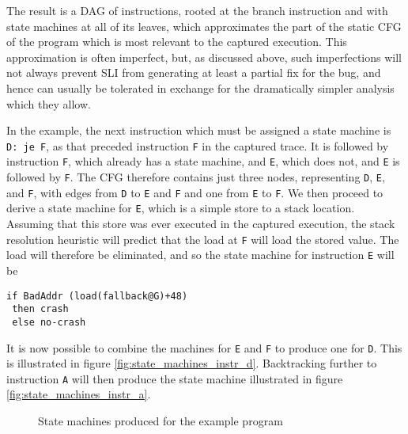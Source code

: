 \documentclass[10pt,twocolumn,preprint,natbib,authoryear]{sigplanconf}
\begin{document}
The result is a DAG of instructions, rooted at the branch instruction
and with state machines at all of its leaves, which approximates the
part of the static CFG of the program which is most relevant to the
captured execution.  This approximation is often imperfect, but, as
discussed above, such imperfections will not always prevent SLI from
generating at least a partial fix for the bug, and hence can usually
be tolerated in exchange for the dramatically simpler analysis which
they allow.

In the example, the next instruction which must be assigned a state
machine is \verb|D: je F|, as that preceded instruction \verb|F| in
the captured trace.  It is followed by instruction \verb|F|, which
already has a state machine, and \verb|E|, which does not, and
\verb|E| is followed by \verb|F|.  The CFG therefore contains just
three nodes, representing \verb|D|, \verb|E|, and \verb|F|, with edges
from \verb|D| to \verb|E| and \verb|F| and one from \verb|E| to
\verb|F|.  We then proceed to derive a state machine for \verb|E|,
which is a simple store to a stack location.  Assuming that this store
was ever executed in the captured execution, the stack resolution
heuristic will predict that the load at \verb|F| will load the stored
value.  The load will therefore be eliminated, and so the state
machine for instruction \verb|E| will be

\begin{verbatim}
if BadAddr (load(fallback@G)+48)
 then crash
 else no-crash
\end{verbatim}

It is now possible to combine the machines for \verb|E| and \verb|F|
to produce one for \verb|D|.  This is illustrated in figure
\ref{fig:state_machines_instr_d}.  Backtracking further to instruction
\verb|A| will then produce the state machine illustrated in figure
\ref{fig:state_machines_instr_a}.

\begin{figure*}
\caption{State machines produced for the example program}
\end{figure*}
\end{document}

